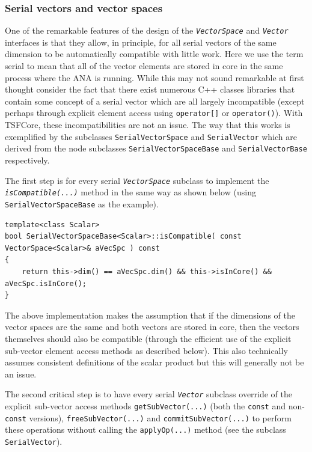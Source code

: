 %
\subsubsection{Serial vectors and vector spaces}
\label{tsfcore:sec:serial_vecs}
%

One of the remarkable features of the design of the
\texttt{\textit{VectorSpace}} and \texttt{\textit{Vector}} interfaces
is that they allow, in principle, for all serial vectors of the same
dimension to be automatically compatible with little work.  Here we
use the term serial to mean that all of the vector elements are stored
in core in the same process where the ANA is running.  While this may
not sound remarkable at first thought consider the fact that there
exist numerous C++ classes libraries that contain some concept of a
serial vector \cite{ref:lumsdaine_and_siek_1998, ref:tnt,
ref:roberts_et_al_1996, ref:math++_1996} which are all largely
incompatible (except perhaps through explicit element access using
\texttt{operator[]} or \texttt{operator()}).  With TSFCore, these
incompatibilities are not an issue.  The way that this works is
exemplified by the subclasses \texttt{SerialVectorSpace} and
\texttt{SerialVector} which are derived from the node subclasses
\texttt{Serial\-VectorSpace\-Base} and
\texttt{SerialVectorBase} respectively.

The first step is for every serial \texttt{\textit{VectorSpace}}
subclass to implement the \texttt{\textit{isCompatible(\-...)}}  method
in the same way as shown below (using \texttt{SerialVectorSpaceBase}
as the example).

{\tiny\begin{verbatim}
template<class Scalar>
bool SerialVectorSpaceBase<Scalar>::isCompatible( const VectorSpace<Scalar>& aVecSpc ) const
{
    return this->dim() == aVecSpc.dim() && this->isInCore() && aVecSpc.isInCore();
}
\end{verbatim}}

The above implementation makes the assumption that if the dimensions
of the vector spaces are the same and both vectors are stored in core,
then the vectors themselves should also be compatible (through the
efficient use of the explicit sub-vector element access methods as
described below).  This also technically assumes consistent
definitions of the scalar product but this will generally not be
an issue.

The second critical step is to have every serial
\texttt{\textit{Vector}} subclass override of the explicit sub-vector
access methods \texttt{getSubVector(...)} (both the \texttt{const} and
non-\texttt{const} versions), \texttt{free\-Sub\-Vector(...)} and
\texttt{commit\-Sub\-Vector(...)} to perform these operations without
calling the \texttt{applyOp(\-...)} method (see the subclass
\texttt{SerialVector}).

